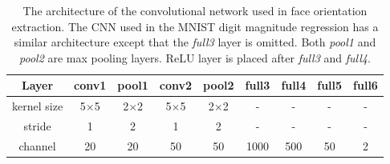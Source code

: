 \documentclass[twoside,11pt]{article}
\begin{document}
\begin{table*}[!thp]
  \centering
  \begin{tabular}{|c|c|c|c|c|c|c|c|c|}
     \hline
     Layer & conv1      & pool1      & conv2      & pool2      & full3 & full4 & full5 & full6 \\ \hline\hline
     kernel size & 5$\times$5 & 2$\times$2 & 5$\times$5 & 2$\times$2 & -     &  -    &   -   & - \\
     stride      & 1          & 2          & 1          & 2          & -     &  -    &   -   & - \\
     channel     & 20         & 20         & 50         & 50         & 1000  & 500   & 50    & 2 \\
     \hline
   \end{tabular}
  \caption{The architecture of the convolutional network used in face orientation extraction. The CNN used in the MNIST digit magnitude regression has a similar architecture except that the {\it full3} layer is omitted. Both {\it pool1} and {\it pool2} are max pooling layers. ReLU layer is placed after {\it full3} and {\it full4}.}
  \label{tab:cnn-arch}
\end{table*}
\end{document}
